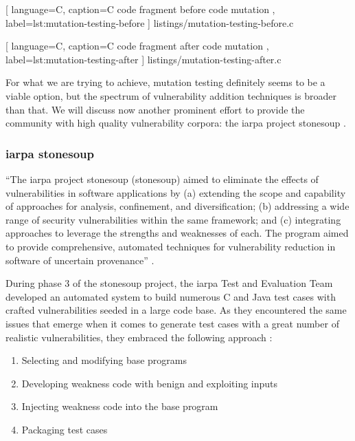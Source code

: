 \vspace{0.5cm}


    [
        language=C,
        caption=C code fragment before code mutation \cite{wikipedia2016mutation},
        label=lst:mutation-testing-before
    ]
    {listings/mutation-testing-before.c}


    [
        language=C,
        caption=C code fragment after code mutation \cite{wikipedia2016mutation},
        label=lst:mutation-testing-after
    ]
    {listings/mutation-testing-after.c}

For what we are trying to achieve, mutation testing definitely seems to be a viable option, but the spectrum of vulnerability addition techniques is broader than that. We will discuss now another prominent effort to provide the community with high quality vulnerability corpora: the \gls{iarpa} project \gls{stonesoup} \cite{iarpa2014stonesoup}.

\clearpage

\subsubsection{\gls{iarpa} \gls{stonesoup}}

``The \acrfull{iarpa} project \gls{stonesoup} (\acrlong{stonesoup}) aimed to eliminate the effects of vulnerabilities in software applications by (a) extending the scope and capability of approaches for analysis, confinement, and diversification; (b) addressing a wide range of security vulnerabilities within the same framework; and (c) integrating approaches to leverage the strengths and weaknesses of each. The program aimed to provide comprehensive, automated techniques for vulnerability reduction in software of uncertain provenance'' \cite{iarpa2014stonesoup}.

During phase 3 of the \gls{stonesoup} project, the \gls{iarpa} Test and Evaluation Team developed an automated system to build numerous C and Java test cases with crafted vulnerabilities seeded in a large code base. As they encountered the same issues that emerge when it comes to generate test cases with a great number of realistic vulnerabilities, they embraced the following approach \cite{iarpa2014stonesoup}:

\begin{enumerate}
    \item Selecting and modifying base programs
    \item Developing weakness code with benign and exploiting inputs
    \item Injecting weakness code into the base program
    \item Packaging test cases
\end{enumerate}

